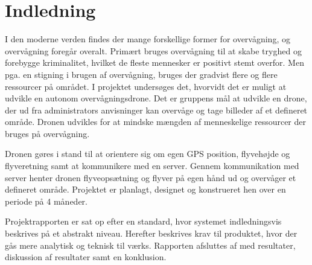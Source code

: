 \chapter{Indledning}
\label{chap:indledning}

I den moderne verden findes der mange forskellige former for overvågning, og overvågning foregår overalt. Primært bruges overvågning til at skabe tryghed og forebygge kriminalitet, hvilket de fleste mennesker er positivt stemt overfor. Men pga. en stigning i brugen af overvågning, bruges der gradvist flere og flere ressourcer på området. 
I projektet undersøges det, hvorvidt det er muligt at udvikle en autonom overvågningsdrone. Det er gruppens mål at udvikle en drone, der ud fra administrators anvisninger kan overvåge og tage billeder af et defineret område. Dronen udvikles for at mindske mængden af menneskelige ressourcer der bruges på overvågning.

Dronen gøres i stand til at orientere sig om egen GPS position, flyvehøjde og flyveretning samt at kommunikere med en server. Gennem kommunikation med server henter dronen flyveopsætning og flyver på egen hånd ud og overvåger et defineret område. Projektet er planlagt, designet og konstrueret hen over en periode på 4 måneder.

Projektrapporten er sat op efter en standard, hvor systemet indledningsvis beskrives på et abstrakt niveau. Herefter beskrives krav til produktet, hvor der gås mere analytisk og teknisk til værks. Rapporten afsluttes af med resultater, diskussion af resultater samt en konklusion.


